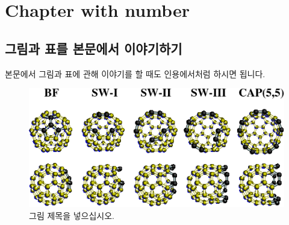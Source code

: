 \chapter{Chapter with number}
\section{그림과 표를 본문에서 이야기하기}

본문에서 그림과 표에 관해 이야기를 할 때도 인용에서처럼 하시면 됩니다.



\begin{figure}[t]
    \centerline{\includegraphics[width=12.5cm]{figures/sample-fig1}} %
    \caption[캡션제목 넣으십시오]{그림 제목을 넣으십시오.
    } \label{mag-fig1}
\end{figure}
